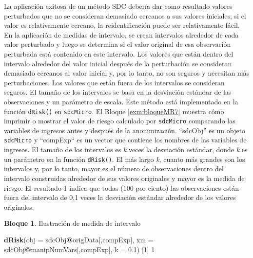 \documentclass[]{book}
\newenvironment{Shaded}{\begin{snugshade}}{\end{snugshade}}
\newcommand{\DataTypeTok}[1]{\textcolor[rgb]{0.13,0.29,0.53}{#1}}
\newcommand{\DecValTok}[1]{\textcolor[rgb]{0.00,0.00,0.81}{#1}}
\newcommand{\FloatTok}[1]{\textcolor[rgb]{0.00,0.00,0.81}{#1}}
\newcommand{\KeywordTok}[1]{\textcolor[rgb]{0.13,0.29,0.53}{\textbf{#1}}}
\newcommand{\NormalTok}[1]{#1}
\newcommand{\OperatorTok}[1]{\textcolor[rgb]{0.81,0.36,0.00}{\textbf{#1}}}
\theoremstyle{definition}
\theoremstyle{definition}
\newtheorem{example}{Bloque}[chapter]
\theoremstyle{definition}
\theoremstyle{definition}
\theoremstyle{remark}
\begin{document}
La aplicación exitosa de un método SDC debería dar como resultado valores perturbados que no se consideran demasiado cercanos a sus valores iniciales; si el valor es relativamente cercano, la reidentificación puede ser relativamente fácil. En la aplicación de medidas de intervalo, se crean intervalos alrededor de cada valor perturbado y luego se determina si el valor original de esa observación perturbada está contenido en este intervalo. Los valores que están dentro del intervalo alrededor del valor inicial después de la perturbación se consideran demasiado cercanos al valor inicial y, por lo tanto, no son seguros y necesitan más perturbaciones. Los valores que están fuera de los intervalos se consideran seguros. El tamaño de los intervalos se basa en la desviación estándar de las observaciones y un parámetro de escala. Este método está implementado en la función \texttt{dRisk()} en \texttt{sdcMicro}. El Bloque \ref{exm:bloqueMR7} muestra cómo imprimir o mostrar el valor de riesgo calculado por \texttt{sdcMicro} comparando las variables de ingresos antes y después de la anonimización. ``sdcObj'' es un objeto \texttt{sdcMicro} y ``compExp`` es un vector que contiene los nombres de las variables de ingresos. El tamaño de los intervalos es \emph{k} veces la desviación estándar, donde \emph{k} es un parámetro en la función \texttt{dRisk()}. El más largo \emph{k}, cuanto más grandes son los intervalos y, por lo tanto, mayor es el número de observaciones dentro del intervalo construidas alrededor de sus valores originales y mayor es la medida de riesgo. El resultado 1 indica que todas (100 por ciento) las observaciones están fuera del intervalo de 0,1 veces la desviación estándar alrededor de los valores originales.

\begin{example}
\protect\hypertarget{exm:bloqueMR7}{}{\label{exm:bloqueMR7} }Ilustración de medida de intervalo
\end{example}

\begin{Shaded}
\begin{Highlighting}[]
 \KeywordTok{dRisk}\NormalTok{(}\DataTypeTok{obj =}\NormalTok{ sdcObj}\OperatorTok{@}\NormalTok{origData[,compExp], }\DataTypeTok{xm =}\NormalTok{ sdcObj}\OperatorTok{@}\NormalTok{manipNumVars[,compExp],}
       \DataTypeTok{k =} \FloatTok{0.1}\NormalTok{)}
\NormalTok{ [}\DecValTok{1}\NormalTok{] }\DecValTok{1}
\end{Highlighting}
\end{Shaded}
\end{document}
